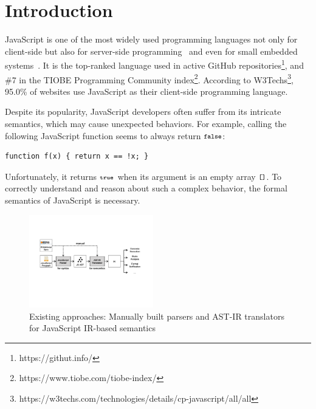 \section{Introduction}
JavaScript is one of the most widely used programming languages not only for
client-side but also for server-side programming~\cite{nodejs, meanjs} and even
for small embedded systems~\cite{espruino, tessel2}.  It is the top-ranked
language used in active GitHub repositories\footnote{https://githut.info/}, and
\#7 in the TIOBE Programming Community
index\footnote{https://www.tiobe.com/tiobe-index/}.  According to
W3Techs\footnote{https://w3techs.com/technologies/details/cp-javascript/all/all},
95.0\% of websites use JavaScript as their client-side programming language.

Despite its popularity, JavaScript developers often suffer from its intricate
semantics, which may cause unexpected behaviors.  For example, calling the
following JavaScript function seems to always return \( \texttt{\footnotesize false} \):
\begin{lstlisting}[style=myJSstyle]
function f(x) { return x == !x; }
\end{lstlisting}
Unfortunately, it returns \( \texttt{\footnotesize true} \) when its argument
is an empty array \( \texttt{\footnotesize[]} \).  To correctly understand and reason about
such a complex behavior, the formal semantics of JavaScript is necessary.

\begin{figure}
  \centering
  \includegraphics[width=0.48\textwidth]{img/existing.pdf}
\vspace*{-2em}
  \caption{Existing approaches: Manually built parsers and AST-IR
  translators for JavaScript IR-based semantics}
  \label{fig:existing}
\vspace*{-1em}
\end{figure}

